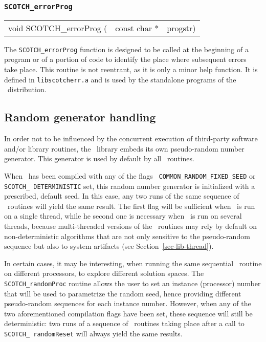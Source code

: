\subsubsection{{\tt SCOTCH\_errorProg}}

\begin{itemize}
\progsyn

{\tt\begin{tabular}{l@{}ll}
void SCOTCH\_errorProg ( & const char * & progstr)
\end{tabular}}

\progdes

The {\tt SCOTCH\_errorProg} function is designed to be called at
the beginning of a program or of a portion of code to identify the
place where subsequent errors take place.
This routine is not reentrant, as it is only a minor help function. It
is defined in {\tt lib\lbt scotch\lbt err.a} and is used by the
standalone programs of the \scotch\ distribution.
\end{itemize}

\subsection{Random generator handling}
\label{sec-lib-random}

In order not to be influenced by the concurrent execution of third-party
software and/or library routines, the \libscotch\ library embeds its
own pseudo-random number generator. This generator is used by default
by all \libscotch\ routines.

When \scotch\ has been compiled with any of the flags {\tt
COMMON\_\lbt RANDOM\_\lbt FIXED\_\lbt SEED} or {\tt SCOTCH\_\lbt
DETERMINISTIC} set, this random number generator is initialized with
a prescribed, default seed. In this case, any two runs of the same
sequence of \libscotch\ routines will yield the same result. The
first flag will be sufficient when \scotch\ is run on a single thread,
while he second one is necessary when \scotch\ is run on several
threads, because multi-threaded versions of the \libscotch\ routines
may rely by default on non-deterministic algorithms that are not only
sensitive to the pseudo-random sequence but also to system artifacts
(see Section~\ref{sec-lib-thread}).

In certain cases, it may be interesting, when running the same
sequential \scotch\ routine on different processors, to explore
different solution spaces. The \texttt{SCOTCH\_\lbt random\lbt Proc}
routine allows the user to set an instance (processor) number that
will be used to parametrize the random seed, hence providing different
pseudo-random sequences for each instance number. However, when any of
the two aforementioned compilation flags have been set, these sequence
will still be deterministic: two runs of a sequence of
\libscotch\ routines taking place after a call to \texttt{SCOTCH\_\lbt
random\lbt Reset} will always yield the same results.

